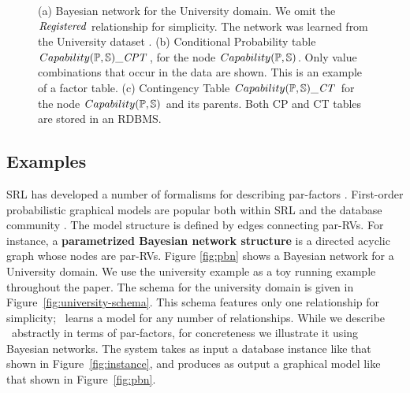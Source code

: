 \documentclass{IEEEtran}
\begin{document}
\begin{figure}[htbp] %
 \centering
{} 
\caption{(a) Bayesian network for the University domain. We omit the $\it{Registered}$ relationship for simplicity. The network was learned from the University dataset \cite{bib:bbsite}.
(b) Conditional Probability table $Capability(\P,\S)\_\cptable$, for the node $Capability(\P,\S)$. Only value combinations that occur in the data are shown. This is an example of a factor table. (c) Contingency Table $Capability(\P,\S)\_\cttable$ for the node $Capability(\P,\S)$ and its parents. Both CP and CT tables are stored in an RDBMS.}
 \label{fig:pbn}
\label{fig:ct-cp-table}
\end{figure}

\subsection{Examples} \label{sec:examples} SRL has developed a number of formalisms for describing par-factors \cite{Kimmig2015}. 
First-order probabilistic graphical models
are popular both within SRL and the database community \cite{Kimmig2015,Wang2008}. The model structure is defined by edges connecting par-RVs. For instance, a \textbf{parametrized Bayesian network structure} is a directed acyclic graph whose nodes are par-RVs.  Figure \ref{fig:pbn} shows a Bayesian network for a University domain. We use the university example as a toy running example throughout the paper. The schema for the university domain is given in Figure~\ref{fig:university-schema}. This schema features only one relationship for simplicity; \FB\ learns a model for any number of relationships. While we describe \FB\ abstractly in terms of par-factors, for concreteness we illustrate it using Bayesian networks. The system takes as input a database instance like that shown in Figure~\ref{fig:instance}, and produces as output a graphical model like that shown in Figure~\ref{fig:pbn}.  
\end{document}
